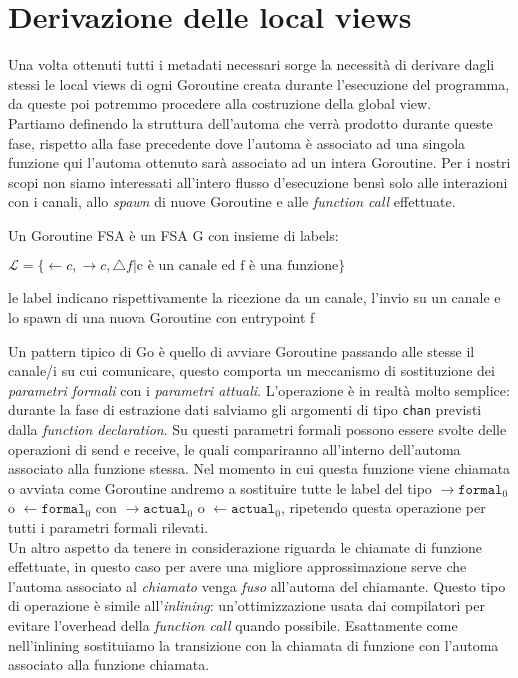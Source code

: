 \section{Derivazione delle local views}
Una volta ottenuti tutti i metadati necessari sorge la necessità di derivare dagli stessi le local views di ogni Goroutine creata durante l'esecuzione del programma, da queste poi potremmo procedere alla costruzione della global view.\bigskip\\
Partiamo definendo la struttura dell'automa che verrà prodotto durante queste fase, rispetto alla fase precedente dove l'automa è associato ad una singola funzione qui l'automa ottenuto sarà associato ad un intera Goroutine. Per i nostri scopi non siamo interessati all'intero flusso d'esecuzione bensì solo alle interazioni con i canali, allo \emph{spawn} di nuove Goroutine e alle \emph{function call} effettuate.
\begin{definition}
    Un Goroutine FSA è un FSA G con insieme di labels:
    \begin{center}
        $\mathcal{L} = \{ \leftarrow c, \rightarrow c, \bigtriangleup f | \text{c è un canale ed f è una funzione} \}$
    \end{center}
    le label indicano rispettivamente la ricezione da un canale, l'invio su un canale e lo spawn di una nuova Goroutine con entrypoint f
\end{definition}
Un pattern tipico di Go è quello di avviare Goroutine passando alle stesse il canale/i su cui comunicare, questo comporta un meccanismo di sostituzione dei \emph{parametri formali} con i \emph{parametri attuali}. L'operazione è in realtà molto semplice: durante la fase di estrazione dati salviamo gli argomenti di tipo \texttt{chan} previsti dalla \emph{function declaration}. Su questi parametri formali possono essere svolte delle operazioni di send e receive, le quali compariranno all'interno dell'automa associato alla funzione stessa. Nel momento in cui questa funzione viene chiamata o avviata come Goroutine andremo a sostituire tutte le label del tipo $\rightarrow \texttt{formal}_0$ o $\leftarrow \texttt{formal}_0$ con $\rightarrow \texttt{actual}_0$ o $\leftarrow \texttt{actual}_0$, ripetendo questa operazione per tutti i parametri formali rilevati. \\
Un altro aspetto da tenere in considerazione riguarda le chiamate di funzione effettuate, in questo caso per avere una migliore approssimazione serve che l'automa associato al \emph{chiamato} venga \emph{fuso} all'automa del chiamante. Questo tipo di operazione è simile all'\emph{inlining}: un'ottimizzazione usata dai compilatori per evitare l'overhead della \emph{function call} quando possibile. Esattamente come nell'inlining sostituiamo la transizione con la chiamata di funzione con l'automa associato alla funzione chiamata.\\
